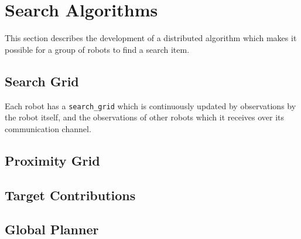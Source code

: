 \section{Search Algorithms}
This section describes the development of a distributed algorithm which makes it possible for a group of robots to find a search item.

\subsection{Search Grid}
Each robot has a \texttt{search\_grid} which is continuously updated by observations by the robot itself, and the observations of other robots which it receives over its communication channel.

\subsection{Proximity Grid}

\subsection{Target Contributions}

\subsection{Global Planner}
